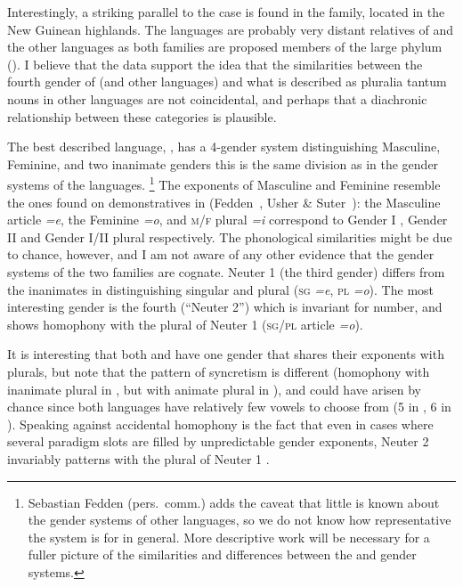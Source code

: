 \documentclass[output=collectionpaper]{langsci/langscibook}
\begin{document}
Interestingly, a striking parallel to the  case is found in the  family, located in the New Guinean highlands. The  languages are probably very distant relatives of  and the other  languages as both families are proposed members of the large  phylum (\citealt{Fedden2011, Usher2015}). I believe that the  data support the idea that the similarities between the fourth gender of  (and other  languages) and what is described as pluralia tantum nouns in other languages are not coincidental, and perhaps that a diachronic relationship between these categories is plausible.

The best described  language, , has a 4-gender system distinguishing Masculine, Feminine, and two inanimate genders \textendash{} this is the same division as in the gender systems of the  languages.%
\footnote{Sebastian Fedden (pers.\ comm.\@) adds the caveat that little is known about the gender systems of other  languages, so we do not know how representative the  system is for  in general. More descriptive work will be necessary for a fuller picture of the similarities and differences between the  and  gender systems.
} %
The exponents of Masculine and Feminine resemble the ones found on demonstratives in  (Fedden~\citeyear[170]{Fedden2011}, Usher \& Suter~\citeyear[118]{Usher2015}): the  Masculine article \emph{=e}, the Feminine \emph{=o}, and \textsc{m}/\textsc{f} plural \emph{=i} correspond to  Gender I , Gender II  and Gender I/II plural  respectively. The phonological similarities might be due to chance, however, and I am not aware of any other evidence that the gender systems of the two families are cognate. Neuter 1 (the third gender) differs from the  inanimates in distinguishing singular and plural (\textsc{sg} \emph{=e}, \textsc{pl} \emph{=o}). The most interesting gender is the fourth (``Neuter 2'') which is invariant for number, and shows homophony with the plural of Neuter 1 (\textsc{sg}/\textsc{pl} article \emph{=o}).

It is interesting that both  and  have one gender that shares their exponents with plurals, but note that the pattern of syncretism is different (homophony with inanimate plural in , but with animate plural in ), and could have arisen by chance since both languages have relatively few vowels to choose from (5 in , 6 in ). Speaking against accidental homophony is the fact that even in cases where several paradigm slots are filled by unpredictable gender exponents, Neuter 2 invariably patterns with the plural of Neuter 1 \citep[178--179]{Fedden2011}.
\end{document}
